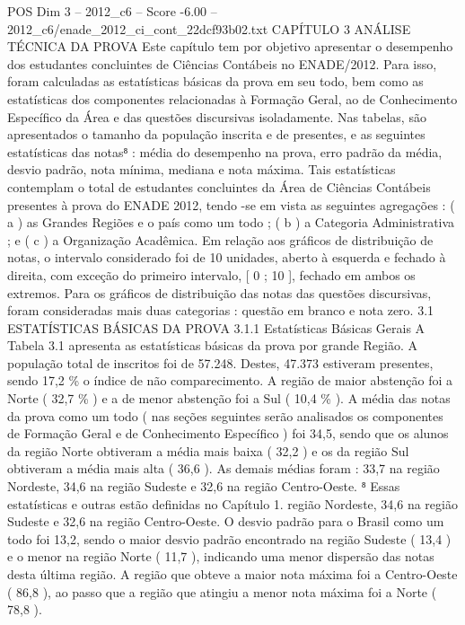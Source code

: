 \begin{textsample}{POS Dim 3 – 2012\_c6 – Score -6.00 – 2012\_c6/enade\_2012\_ci\_cont\_22dcf93b02.txt}  \label{ex:f3_pos_256}
CAPÍTULO 3 ANÁLISE TÉCNICA DA PROVA Este capítulo tem por objetivo apresentar o desempenho dos estudantes concluintes de Ciências Contábeis no ENADE/2012.
Para isso, foram calculadas as estatísticas básicas da prova em seu todo, bem como as estatísticas dos componentes relacionadas à Formação Geral, ao de Conhecimento Específico da Área e das questões discursivas isoladamente.
Nas tabelas, são apresentados o tamanho da população inscrita e de presentes, e as seguintes estatísticas das notas⁸ : média do desempenho na prova, erro padrão da média, desvio padrão, nota mínima, mediana e nota máxima.
Tais estatísticas contemplam o total de estudantes concluintes da Área de Ciências Contábeis presentes à prova do ENADE 2012, tendo -se em vista as seguintes agregações : ( a ) as Grandes Regiões e o país como um todo ; ( b ) a Categoria Administrativa ; e ( c ) a Organização Acadêmica.
Em relação aos gráficos de distribuição de notas, o intervalo considerado foi de 10 unidades, aberto à esquerda e fechado à direita, com exceção do primeiro intervalo, [ 0 ; 10 ], fechado em ambos os extremos.
Para os gráficos de distribuição das notas das questões discursivas, foram consideradas mais duas categorias : questão em branco e nota zero. 3.1 ESTATÍSTICAS BÁSICAS DA PROVA 3.1.1 Estatísticas Básicas Gerais A Tabela 3.1 apresenta as estatísticas básicas da prova por grande Região.
A população total de inscritos foi de 57.248.
Destes, 47.373 estiveram presentes, sendo 17,2 \% o índice de não comparecimento.
A região de maior abstenção foi a Norte ( 32,7 \% ) e a de menor abstenção foi a Sul ( 10,4 \% ).
A média das notas da prova como um todo ( nas seções seguintes serão analisados os componentes de Formação Geral e de Conhecimento Específico ) foi 34,5, sendo que os alunos da região Norte obtiveram a média mais baixa ( 32,2 ) e os da região Sul obtiveram a média mais alta ( 36,6 ).
As demais médias foram : 33,7 na região Nordeste, 34,6 na região Sudeste e 32,6 na região Centro-Oeste. ⁸ Essas estatísticas e outras estão definidas no Capítulo 1. região Nordeste, 34,6 na região Sudeste e 32,6 na região Centro-Oeste.
O desvio padrão para o Brasil como um todo foi 13,2, sendo o maior desvio padrão encontrado na região Sudeste ( 13,4 ) e o menor na região Norte ( 11,7 ), indicando uma menor dispersão das notas desta última região.
A região que obteve a maior nota máxima foi a Centro-Oeste ( 86,8 ), ao passo que a região que atingiu a menor nota máxima foi a Norte ( 78,8 ).

\end{textsample}
